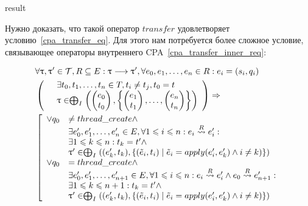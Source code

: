 \begin{enumerate}
\begin{algorithm}
  \Return result

 \caption{$transfer_{TM}(e_0, \pi_0, reached)$}
 \label{cpata_transfer}
\end{algorithm}

Нужно доказать, что такой оператор $transfer$ удовлетворяет условию~\ref{cpa_transfer_eq}.
Для этого нам потребуется более сложное условие, связывающее операторы внутреннего CPA~\ref{cpa_transfer_inner_req}:

\begin{equation}
\begin{aligned}
\label{cpa_transfer_inner_req}
& \forall \uptau, \uptau' \in \mathcal{T}, R \subseteq E: \uptau \longrightarrow \uptau', \forall e_0, e_1, \dots, e_n \in R: e_i = (s_i, q_i) \\
& \left(
\begin{array}{ll}
& \exists t_0, t_1, \dots, t_n \in T, t_i \neq t_j, t_0 = t \\
& \uptau \in \mathrel{\bigoplus}_I
\left(
\begin{pmatrix}
e_0 \\
t_0 
\end{pmatrix},
\left\{
\begin{pmatrix}
e_1 \\
t_1 
\end{pmatrix} ,
\dots ,
\begin{pmatrix}
e_n \\
t_n 
\end{pmatrix}
\right\}
\right)
\end{array}
\right) \Rightarrow \\
& \left[ \begin{array}{ll}
\lor q_0 & \neq thread\_create \land \\
& \exists e'_0, e'_1, \dots, e'_n \in E, \forall 1 \leqslant i \leqslant n: e_i \stackrel{R}{\leadsto} e'_i: \\
& \exists 1 \leqslant k \leqslant n: t_k = t' \land \\
& \uptau' \in \mathrel{\bigoplus}_I((e_k', t_k), \{(\tilde{e}_i, t_i) \mid \tilde{e}_i = apply(e_i', e'_k) \land i \neq k)\}) \\
\lor q_0 & = thread\_create \land \\
& \exists e'_0, e'_1, \dots, e'_{n+1} \in E, \forall 1 \leqslant i \leqslant n: e_i \stackrel{R}{\leadsto} e'_i \land e_0 \stackrel{R}{\leadsto} e'_{n+1}: \\
& \exists 1 \leqslant k \leqslant n + 1: t_k = t' \land \\
& \uptau' \in \mathrel{\bigoplus}_I((e_k', t_k), \{(\tilde{e}_i, t_i) \mid \tilde{e}_i = apply(e_i', e'_k) \land i \neq k)\}) 
\end{array} 
\right.
\end{aligned}
\end{equation}


\end{enumerate}

